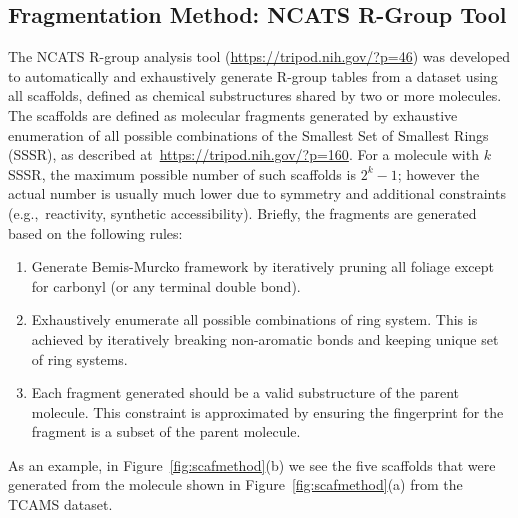 \documentclass[journal=jacsat,manuscript=article]{achemso}
\newcommand*\fref[1]{Figure~\ref{fig:#1}}
\newcommand*\eg{e.g.,~}
\begin{document}
\subsection{Fragmentation Method: NCATS R-Group Tool}
\label{sec:rgtool}
The NCATS R-group analysis tool (\url{https://tripod.nih.gov/?p=46})
was developed to automatically and exhaustively generate R-group
tables from a dataset using all scaffolds, defined as chemical
substructures shared by two or more molecules. The scaffolds are
defined as molecular fragments generated by exhaustive enumeration of
all possible combinations of the Smallest Set of Smallest Rings
(SSSR), as described at~\url{https://tripod.nih.gov/?p=160}. For a
molecule with $k$ SSSR, the maximum possible number of such scaffolds
is $2^k - 1$; however the actual number is usually much lower due to
symmetry and additional constraints (\eg reactivity, synthetic
accessibility). Briefly, the fragments are generated based on the
following rules:
\begin{enumerate}
  \item Generate Bemis-Murcko framework by iteratively pruning all foliage
    except for carbonyl (or any terminal double bond).
  \item Exhaustively enumerate all possible combinations of ring
    system. This is achieved by iteratively breaking non-aromatic
    bonds and keeping unique set of ring systems.
  \item Each fragment generated should be a valid substructure of the
    parent molecule. This constraint is approximated by ensuring the
    fingerprint for the fragment is a subset of the parent molecule.
\end{enumerate}

As an example, in \fref{scafmethod}(b) we see the five scaffolds that
were generated from the molecule shown in \fref{scafmethod}(a) from
the TCAMS dataset.
\end{document}
